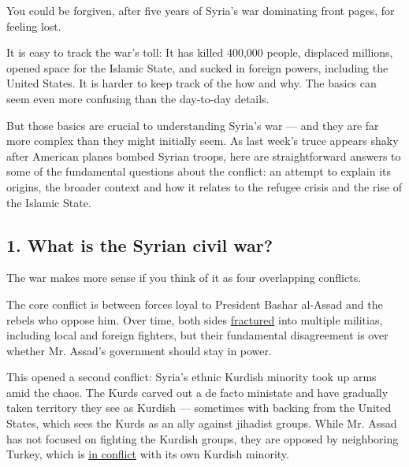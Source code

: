 You could be forgiven, after five years of Syria's war dominating front
pages, for feeling lost.

It is easy to track the war's toll: It has killed 400,000 people,
displaced millions, opened space for the Islamic State, and sucked in
foreign powers, including the United States. It is harder to keep track
of the how and why. The basics can seem even more confusing than the
day-to-day details.

But those basics are crucial to understanding Syria's war --- and they
are far more complex than they might initially seem. As last week's
truce appears shaky after American planes bombed Syrian troops, here are
straightforward answers to some of the fundamental questions about the
conflict: an attempt to explain its origins, the broader context and how
it relates to the refugee crisis and the rise of the Islamic State.

\hypertarget{1-what-is-the-syrian-civil-war}{%
\subsection{\texorpdfstring{\textbf{1. What is the Syrian civil
war?}}{1. What is the Syrian civil war?}}\label{1-what-is-the-syrian-civil-war}}

The war makes more sense if you think of it as four overlapping
conflicts.

The core conflict is between forces loyal to President Bashar al-Assad
and the rebels who oppose him. Over time, both sides
\href{http://warontherocks.com/2016/08/the-decay-of-the-syrian-regime-is-much-worse-than-you-think/}{fractured}
into multiple militias, including local and foreign fighters, but their
fundamental disagreement is over whether Mr. Assad's government should
stay in power.

This opened a second conflict: Syria's ethnic Kurdish minority took up
arms amid the chaos. The Kurds carved out a de facto ministate and have
gradually taken territory they see as Kurdish --- sometimes with backing
from the United States, which sees the Kurds as an ally against jihadist
groups. While Mr. Assad has not focused on fighting the Kurdish groups,
they are opposed by neighboring Turkey, which is
\href{http://www.nytimes3xbfgragh.onion/2016/06/30/world/middleeast/turkeys-twin-terrorist-threats-explained.html?rref=collection\%2Fcolumn\%2Fthe-interpreter\&action=click\&contentCollection=world\&region=stream\&module=stream_unit\&version=latest\&contentPlacement=20\&pgtype=collection}{in
conflict} with its own Kurdish minority.

